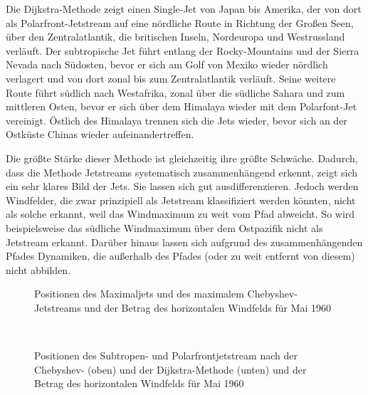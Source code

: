 Die Dijkstra-Methode zeigt einen Single-Jet von Japan bis Amerika, der von dort als Polarfront-Jetstream auf eine nördliche Route in Richtung der Großen Seen, über den Zentralatlantik, die britischen Inseln, Nordeuropa und Westrussland verläuft. Der subtropische Jet führt entlang der Rocky-Mountains und der Sierra Nevada nach Südosten, bevor er sich am Golf von Mexiko wieder nördlich verlagert und von dort zonal bis zum Zentralatlantik verläuft. Seine weitere Route führt südlich nach Westafrika, zonal über die südliche Sahara und zum mittleren Osten, bevor er sich über dem Himalaya wieder mit dem Polarfont-Jet vereinigt. Östlich des Himalaya trennen sich die Jets wieder, bevor sich an der Ostküste Chinas wieder aufeinandertreffen.

Die größte Stärke dieser Methode ist gleichzeitig ihre größte Schwäche. Dadurch, dass die Methode Jetstreams systematisch zusammenhängend erkennt, zeigt sich ein sehr klares Bild der Jets. Sie lassen sich gut ausdifferenzieren. Jedoch werden Windfelder, die zwar prinzipiell als Jetstream klassifiziert werden könnten, nicht als solche erkannt, weil das Windmaximum zu weit vom Pfad abweicht. So wird beispielsweise das südliche Windmaximum über dem Ostpazifik nicht als Jetstream erkannt. Darüber hinaus lassen sich aufgrund des zusammenhängenden Pfades Dynamiken, die außerhalb des Pfades (oder zu weit entfernt von diesem) nicht abbilden.


\begin{figure}
  \centering
  \begin{minipage}{\textwidth}
    \centering
  \end{minipage} 
  \caption[Vergleich des maximalen Chebyshev-Fits und des meridionalen Maximums für Mai 1960]{Positionen des Maximaljets und des maximalem Chebyshev-Jetstreams und der Betrag des horizontalen Windfelds für Mai 1960} \label{fig:case-1960-may-a}
\end{figure}


\begin{figure}
  \centering
    \begin{minipage}{\textwidth}
      \centering
  \end{minipage} \\ 
  \begin{minipage}{\textwidth}
    \centering
  \end{minipage}
  \caption[Vergleich der Chebyshev- und der Dijkstra-Methode für den Mai 1960]{Positionen des Subtropen- und Polarfrontjetstream nach der Chebyshev- (oben) und der Dijkstra-Methode (unten) und der Betrag des horizontalen Windfelds für Mai 1960} \label{fig:case-1960-may-b}
\end{figure}



